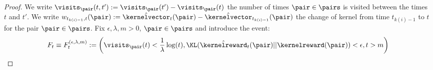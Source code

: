\documentclass[preprint,cleveref,12pt]{colt2025}
\DeclarePairedDelimiter{\parens}{(}{)}	%
\def\kernel{\kernelvector}
\def\kerrew{\kernelreward}
\begin{document}
    \begin{proof}
        We write $\visits_\pair(t,t') := \visits_\pair(t') - \visits_\pair(t)$ the number of times $\pair \in \pairs$ is visited between the times $t$ and $t'$.
        We write $w_{t_{k(i)-1}, t}(\pair) := \hat{\kernel}_t(\pair) - \hat{\kernel}_{t_{k(i)-1}}(\pair)$ the change of kernel from time $t_{k(i)-1}$ to $t$ for the pair $\pair \in \pairs$. 
        Fix $\epsilon, \lambda, m > 0$, $\pair \in \pairs$ and introduce the event:
        \begin{equation}
            F_{t} 
            \equiv 
            F_t^{(\epsilon, \lambda, m)}
            := 
            \parens*{
                \visits_\pair(t) < \frac 1\lambda \log(t), 
                \KL(\hat{\kerrew}_t(\pair)||\kerrew(\pair)) < \epsilon, 
                t > m
            }
        \end{equation}


\end{proof}
\end{document}
